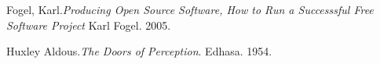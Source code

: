 \documentclass[a4paper, 11pt, oneside]{article}
\theoremstyle{definition}
\theoremstyle{remark}
\begin{document}

\begin{thebibliography}{99}


 Fogel, Karl.\emph{Producing Open Source Software, How to Run a
Successsful Free Software Project} Karl Fogel. 2005.

 Huxley Aldous.\emph{The Doors of Perception}. Edhasa. 1954.

\end{thebibliography}
\end{document}
